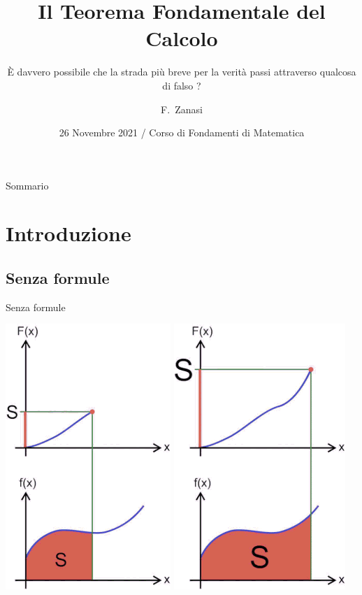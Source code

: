 \documentclass[8pt]{beamer}
\title[Il Teorema Fondamentale del Calcolo] %
{Il Teorema Fondamentale del Calcolo}
\subtitle
{È davvero possibile che la strada più breve per la verità passi attraverso qualcosa di falso ? \cite{Stillwell}} %
\author[F.~Zanasi, Matricola 48359] %
{F.~Zanasi\inst{1} }
\institute[Universities of Somewhere and Elsewhere] %
{
  \inst{1}%
  Corso di Laurea in Didattica e Comunicazione delle Scienze\\
  Università di Modena e Reggio Emilia
}
\date[Short Occasion] %
{26 Novembre 2021 / Corso di Fondamenti di Matematica}
\begin{document}
\begin{frame}
  \titlepage
\end{frame}

\begin{frame}{Sommario}
  \tableofcontents
\end{frame}

\section{Introduzione}
\subsection{Senza formule}
\begin{frame}{Senza formule}
  \begin{center}
    \includegraphics[scale=.2]{Z-158.png}
    \includegraphics[scale=.2]{Z-170.png}

\end{center}
\end{frame}
\end{document}
